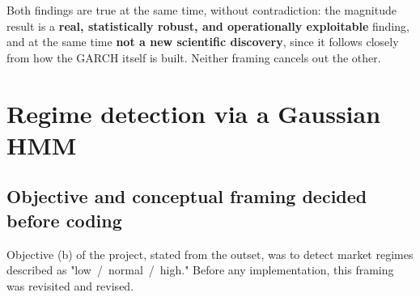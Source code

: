 \documentclass[12pt,a4paper]{article}
\begin{document}
Both findings are true at the same time, without contradiction: the
magnitude result is a \textbf{real,
	statistically robust, and operationally exploitable} finding, and at
the same time \textbf{not a new scientific discovery}, since it
follows closely from how the GARCH itself is built. Neither
framing cancels out the other.

\newpage

\section{Regime detection via a Gaussian HMM}
\label{sec:regime-hmm}

\subsection{Objective and conceptual framing decided before coding}

Objective (b) of the project, stated from the outset, was to detect
market regimes described as "low~/~normal~/~high."
Before any implementation, this framing was revisited and revised.


\end{document}

